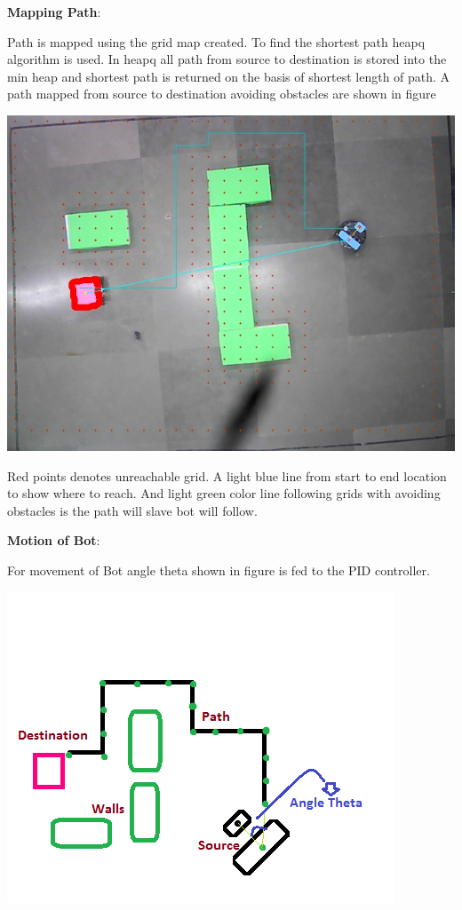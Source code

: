 \documentclass[report]{res}
\begin{document}
	\pagebreak	
	
	
	\textbf{Mapping Path}:
	
	Path is mapped using the grid map created. To find the shortest path heapq algorithm is used. In heapq all path from source to destination is stored into the min heap and shortest path is returned on the basis of shortest length of path. A path mapped from source to destination avoiding obstacles are shown in figure\\
	
	\begin{center}
	\includegraphics[scale = 0.8]{graphics/case1/path_route.jpeg}\\
	\end{center}
		
	Red points denotes unreachable grid. A light blue line from start to end location to show where to reach. And light green color line following grids with avoiding obstacles is the path will slave bot will follow.
	
	\pagebreak
	
	
	\textbf{Motion of Bot}:
	
	For movement of Bot angle theta shown in figure is fed to the PID 
	controller.\\
	
	\begin{center}
	\includegraphics[scale = 1.3]{graphics/pid_error.png}\\
	\end{center}
		
\end{document}
